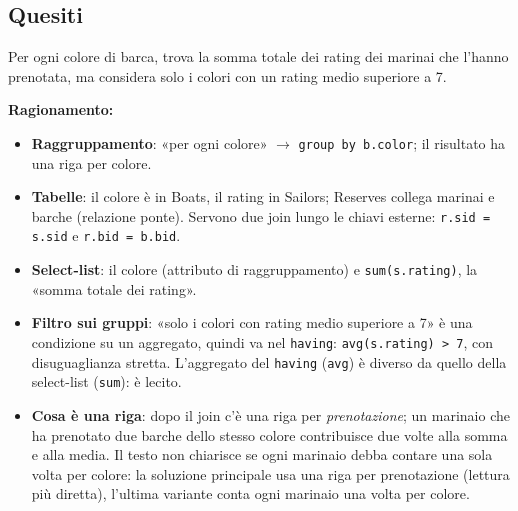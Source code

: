 \documentclass[12pt, a4paper]{article}
\begin{document}
\subsection{Quesiti}

\begin{tcolorbox}[colback=lightergray!10, colframe=tocsec, title=\textbf{Esercizio SQL 1}]
Per ogni colore di barca, trova la somma totale dei rating dei marinai che l'hanno prenotata, ma considera solo i colori con un rating medio superiore a 7.
\end{tcolorbox}

\textbf{Ragionamento:}
\begin{itemize}
\item \textbf{Raggruppamento}: «per ogni colore» $\to$ \texttt{group by b.color}; il risultato ha una riga per colore.
\item \textbf{Tabelle}: il colore è in Boats, il rating in Sailors; Reserves collega marinai e barche (relazione ponte). Servono due join lungo le chiavi esterne: \mbox{\texttt{r.sid = s.sid}} e \mbox{\texttt{r.bid = b.bid}}.
\item \textbf{Select-list}: il colore (attributo di raggruppamento) e \texttt{sum(s.rating)}, la «somma totale dei rating».
\item \textbf{Filtro sui gruppi}: «solo i colori con rating medio superiore a 7» è una condizione su un aggregato, quindi va nel \texttt{having}: \mbox{\texttt{avg(s.rating) > 7}}, con disuguaglianza stretta. L'aggregato del \texttt{having} (\texttt{avg}) è diverso da quello della select-list (\texttt{sum}): è lecito.
\item \textbf{Cosa è una riga}: dopo il join c'è una riga per \emph{prenotazione}; un marinaio che ha prenotato due barche dello stesso colore contribuisce due volte alla somma e alla media. Il testo non chiarisce se ogni marinaio debba contare una sola volta per colore: la soluzione principale usa una riga per prenotazione (lettura più diretta), l'ultima variante conta ogni marinaio una volta per colore.
\end{itemize}
\end{document}
